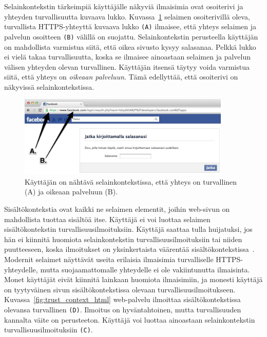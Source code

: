 \documentclass[finnish,gradu]{tktltiki}
\begin{document}
  Selainkontekstin tärkeimpiä käyttäjälle näkyviä ilmaisimia ovat osoiterivi ja yhteyden turvallisuutta kuvaava lukko. Kuvassa~\ref{fig:facebook_reauth_ab} selaimen osoiterivillä oleva, turvallista HTTPS-yhteyttä kuvaava lukko \verb!(A)! ilmaisee, että yhteys selaimen ja palvelun osoitteen \verb!(B)! välillä on suojattu. Selainkontekstin perusteella käyttäjän on mahdollista varmistua siitä, että oikea sivusto kysyy salasanaa. Pelkkä lukko ei vielä takaa turvallisuutta, koska se ilmaisee ainoastaan selaimen ja palvelun välisen yhteyden olevan turvallinen. Käyttäjän itsensä täytyy voida varmistua siitä, että yhteys on \emph{oikeaan palveluun}. Tämä edellyttää, että osoiterivi on näkyvissä selainkontekstissa.

  \begin{figure}
    \centering
    \includegraphics[width=0.9\textwidth]{images/Facebook_reauth_ab.jpg}
    \caption[Selainkontekstin esittely.]{Käyttäjän on nähtävä selainkontekstissa, että yhteys on turvallinen (A) ja oikeaan palveluun (B).}
    \label{fig:facebook_reauth_ab}
  \end{figure}

  Sisältökontekstia ovat kaikki ne selaimen elementit, joihin web-sivun on mahdollista tuottaa sisältöä itse. Käyttäjä ei voi luottaa selaimen sisältökontekstin turvallisuusilmoituksiin. Käyttäjä saattaa tulla huijatuksi, jos hän ei kiinnitä huomiota selainkontekstin turvallisuusilmoituksiin tai niiden puutteeseen, koska ilmoitukset on yksinkertaista väärentää sisältökontekstissa~\cite{why_phishing_works_06}. Modernit selaimet näyttävät useita erilaisia ilmaisimia turvalliselle HTTPS-yhteydelle, mutta suojaamattomalle yhteydelle ei ole vakiintunutta ilmaisinta. Monet käyttäjät eivät kiinnitä lainkaan huomiota ilmaisimiin, ja monesti käyttäjä on tyytyväinen sivun sisältökontekstissa olevaan turvallisuusilmoitukseen. Kuvassa~\ref{fig:trust_context_html} web-palvelu ilmoittaa sisältökontekstissa olevansa turvallinen \verb!(D)!. Ilmoitus on hyväntahtoinen, mutta turvallisuuden kannalta väite on perusteeton. Käyttäjä voi luottaa ainoastaan selainkontekstin turvallisuusilmoituksiin \verb!(C)!.
\end{document}
